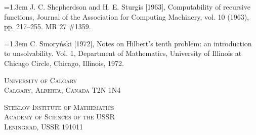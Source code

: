 \documentclass[11pt,leqno]{article}
\newcommand{\bibentry}[1]{\par\noindent\hangindent=1.3em\hangafter=1 #1\par\smallskip}
\begin{document}
\bibentry{J. C. Shepherdson and H. E. Sturgis [1963], Computability of recursive functions, Journal of the Association for Computing Machinery, vol. 10 (1963), pp. 217--255. MR 27 \#1359.}

\bibentry{C. Smory\'{n}ski [1972], Notes on Hilbert's tenth problem: an introduction to unsolvability. Vol. 1, Department of Mathematics, University of Illinois at Chicago Circle, Chicago, Illinois, 1972.}
\endgroup

\bigskip
\noindent\begin{minipage}[t]{0.48\linewidth}
\small\scshape University of Calgary\\
Calgary, Alberta, Canada T2N 1N4
\end{minipage}\hfill
\begin{minipage}[t]{0.48\linewidth}
\small\scshape Steklov Institute of Mathematics\\
Academy of Sciences of the USSR\\
Leningrad, USSR 191011
\end{minipage}
\end{document}
